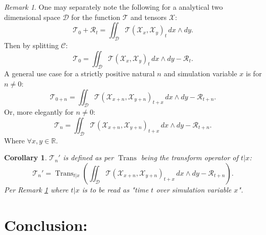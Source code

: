 \documentclass[10pt]{article}
\theoremstyle{plain}
\newtheorem{corollary}[theorem]{Corollary}
\theoremstyle{definition}
\theoremstyle{remark}
\newtheorem{remark}[theorem]{Remark}
\begin{document}
\begin{remark}
\label{rem:math-special-case}
	One may separately note the following for a analytical two dimensional space $\mathcal{D}$ for the function $\mathcal{T}$ and tensors $\mathcal{X}$:
	\begin{equation}
		\mathcal{T}_0 + \mathcal{R}_{t} = \iint_{\mathcal{D}} \mathcal{T}(\mathcal{X}_{x}, \mathcal{X}_{y})_{t} \, dx \land dy.
	\end{equation}
	Then by splitting $\mathcal{C}$:
	\begin{equation}
		\mathcal{T}_0 = \iint_{\mathcal{D}} \mathcal{T}(\mathcal{X}_{x}, \mathcal{X}_{y})_{t} \, dx \land dy - \mathcal{R}_{t}.
	\end{equation}
	A general use case for a strictly positive natural $n$ and simulation variable $x$ is for $n \neq 0$:
	\begin{equation}
		\mathcal{T}_{0+n} = \iint_{\mathcal{D}} \mathcal{T}(\mathcal{X}_{x+n}, \mathcal{X}_{y+n})_{t+x} \, dx \land dy - \mathcal{R}_{t+n}.
	\end{equation}
	Or, more elegantly for $n \neq 0$:
	\begin{equation}
		\mathcal{T}_{n} = \iint_{\mathcal{D}} \mathcal{T}(\mathcal{X}_{x+n}, \mathcal{X}_{y+n})_{t+x} \, dx \land dy - \mathcal{R}_{t+n}.
	\end{equation}
	Where $\forall x, y \in \mathbb{R}$.
\end{remark}

\begin{corollary}
	$\mathcal{T}_{n}'$ is defined as per $\operatorname{Trans}$ being the transform operator of $t|x$:
	\begin{equation}
		\mathcal{T}_{n}' =\operatorname{Trans}_{t|x}(\iint_{\mathcal{D}} \mathcal{T}(\mathcal{X}_{x+n}, \mathcal{X}_{y+n})_{t+x} \, dx \land dy - \mathcal{R}_{t+n}).
	\end{equation}
	Per Remark \ref{rem:math-special-case} where $t|x$ is to be read as "time $t$ over simulation variable $x$".
\end{corollary}

\section{Conclusion:}

\nocite{*}



\end{document}
